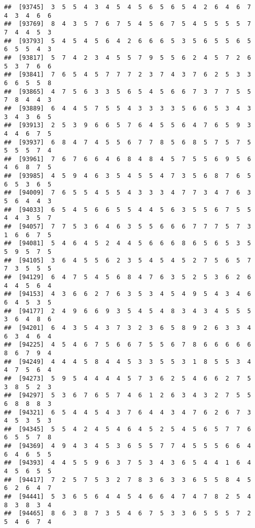 \documentclass[
]{book}
\begin{document}
\begin{verbatim}
##  [93745]  3  5  5  4  3  4  5  4  5  6  5  6  5  4  2  6  4  6  7  4  3  4  6  6
##  [93769]  8  4  3  5  7  6  7  5  4  5  6  7  5  4  5  5  5  5  7  7  4  4  5  3
##  [93793]  5  4  5  4  5  6  4  2  6  6  6  5  3  5  6  5  5  6  5  6  5  5  4  3
##  [93817]  5  7  4  2  3  4  5  5  7  9  5  5  6  2  4  5  7  2  6  5  3  7  6  6
##  [93841]  7  6  5  4  5  7  7  7  2  3  7  4  3  7  6  2  5  3  3  6  6  5  5  8
##  [93865]  4  7  5  6  3  3  5  6  5  4  5  6  6  7  3  7  7  5  5  7  8  4  4  3
##  [93889]  6  4  4  5  7  5  5  4  3  3  3  3  5  6  6  5  3  4  3  3  4  3  6  5
##  [93913]  2  5  3  9  6  6  5  7  6  4  5  5  6  4  7  6  5  9  3  4  4  6  7  5
##  [93937]  6  8  4  7  4  5  5  6  7  7  8  5  6  8  5  7  5  7  5  5  5  5  7  4
##  [93961]  7  6  7  6  6  4  6  8  4  8  4  5  7  5  5  6  9  5  6  4  6  8  7  5
##  [93985]  4  5  9  4  6  3  5  4  5  5  4  7  3  5  6  8  7  6  5  6  5  3  6  5
##  [94009]  7  6  5  5  4  5  5  4  3  3  3  4  7  7  3  4  7  6  3  5  6  4  4  3
##  [94033]  6  5  4  5  6  6  5  5  4  4  5  6  3  5  5  6  7  5  5  4  4  3  5  7
##  [94057]  7  7  5  3  6  4  6  3  5  5  6  6  6  7  7  7  5  7  3  1  6  6  7  5
##  [94081]  5  4  6  4  5  2  4  4  5  6  6  6  8  6  5  6  5  3  5  5  9  5  7  5
##  [94105]  3  6  4  5  5  6  2  3  5  4  5  4  5  2  7  5  6  5  7  7  3  5  5  5
##  [94129]  6  4  7  5  4  5  6  8  4  7  6  3  5  2  5  3  6  2  6  4  4  5  6  4
##  [94153]  4  3  6  6  2  7  6  3  5  3  4  5  4  9  5  4  3  4  6  6  4  5  3  5
##  [94177]  2  4  9  6  6  9  3  5  4  5  4  8  3  4  3  4  5  5  5  3  6  4  8  6
##  [94201]  6  4  3  5  4  3  7  3  2  3  6  5  8  9  2  6  3  3  4  6  3  4  6  4
##  [94225]  4  5  4  6  7  5  6  6  7  5  5  6  7  8  6  6  6  6  6  8  6  7  9  4
##  [94249]  4  4  4  5  8  4  4  5  3  3  5  5  3  1  8  5  5  3  4  4  7  5  6  4
##  [94273]  5  9  5  4  4  4  4  5  7  3  6  2  5  4  6  6  2  7  5  3  8  5  2  3
##  [94297]  5  3  6  7  6  5  7  4  6  1  2  6  3  4  3  2  7  5  5  6  8  8  8  3
##  [94321]  6  5  4  4  5  4  3  7  6  4  4  3  4  7  6  2  6  7  3  4  5  3  5  3
##  [94345]  5  5  4  2  4  5  4  6  4  5  2  5  4  5  6  5  7  7  6  6  5  5  7  8
##  [94369]  4  9  4  3  4  5  3  6  5  5  7  7  4  5  5  5  6  6  4  6  4  6  5  5
##  [94393]  4  4  5  5  9  6  3  7  5  3  4  3  6  5  4  4  1  6  4  4  5  6  5  5
##  [94417]  7  2  5  7  5  3  2  7  8  3  6  3  3  6  5  5  8  4  5  6  2  6  4  7
##  [94441]  5  3  6  5  6  4  4  5  4  6  6  4  7  4  7  8  2  5  4  8  3  8  3  4
##  [94465]  8  6  3  8  7  3  5  4  6  7  5  3  3  6  5  5  5  7  2  5  4  6  7  4

\end{verbatim}
\end{document}
